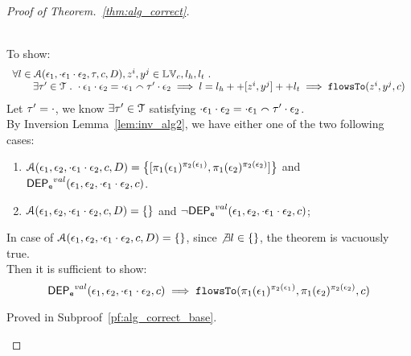 \begin{proof}[Proof of Theorem.~\ref{thm:alg_correct}]
\begin{case}
\\
To show:
\[
\begin{array}{l}
   \forall l \in \mathcal{A}(\mathtt{\epsilon}_1, \cdot  \mathtt{\epsilon}_1  {} \cdot {} \mathtt{\epsilon}_2, \mathtt{\tau}, c, D), z^i, y^j \in \mathbb{LV}_c, l_h, l_t ~.~ 
  \\ \qquad 
   \exists \mathtt{\tau}' \in \mathcal{T} ~.~ 
   \cdot \mathtt{\epsilon}_1  {} \cdot {} \mathtt{\epsilon}_2 = \cdot \mathtt{\epsilon}_1 \smallfrown \mathtt{\tau}' \cdot \mathtt{\epsilon}_2
   \implies 
   l = l_h ++ [z^i, y^j] ++ l_t 
   \implies \mathtt{flowsTo}(z^i, y^j, c)
\end{array}
\]
%
Let $\mathtt{\tau}' = \cdot$, we know $\exists \mathtt{\tau}' \in \mathcal{T}$ satisfying 
$\cdot {} \mathtt{\epsilon}_1  {} \cdot {} \mathtt{\epsilon}_2 = \cdot {} \mathtt{\epsilon}_1 \smallfrown \mathtt{\tau}' \cdot \mathtt{\epsilon}_2$.
\\
By Inversion Lemma~\ref{lem:inv_alg2}, we have either one of the two following cases:
\begin{enumerate}
  \item $\mathcal{A}(\event_1, \event_2, \cdot \event_1 \cdot \event_2, c, D) = 
  \left\{[\pi_1(\event_1)^{\pi_2(\event_1)}, \pi_1(\event_2)^{\pi_2(\event_2)}] \right \}$ 
  and $\mathsf{DEP_{\mathtt{e}}}^{val}(\mathtt{\epsilon}_1, \mathtt{\epsilon}_2, \cdot  \mathtt{\epsilon}_1 \cdot \mathtt{\epsilon}_2, c)$.
  \item  $\mathcal{A}(\mathtt{\epsilon}_1, \mathtt{\epsilon}_2, \cdot \mathtt{\epsilon}_1 \cdot \mathtt{\epsilon}_2, c, D) = \{\}$ 
  and $\neg \mathsf{DEP_{\mathtt{e}}}^{val}(\mathtt{\epsilon}_1, \mathtt{\epsilon}_2, \cdot  \mathtt{\epsilon}_1 \cdot \mathtt{\epsilon}_2, c)$;
\end{enumerate}
%
In case of $\mathcal{A}(\mathtt{\epsilon}_1, \mathtt{\epsilon}_2, \cdot \mathtt{\epsilon}_1 \cdot \mathtt{\epsilon}_2, c, D) = \{\}$,
since $\not\exists l \in \{\}$, the theorem is vacuously true.
%
\\
Then it is sufficient to show:
%
\[
  \mathsf{DEP_{\mathtt{e}}}^{val}(\mathtt{\epsilon}_1, \mathtt{\epsilon}_2, \cdot \mathtt{\epsilon}_1 \cdot \mathtt{\epsilon}_2, c) \implies \mathtt{flowsTo}(\pi_1(\mathtt{\epsilon}_1)^{\pi_2(\mathtt{\epsilon}_1)}, \pi_1(\mathtt{\epsilon}_2)^{\pi_2(\mathtt{\epsilon}_2)}, c)
\]
%

Proved in Subproof~\ref{pf:alg_correct_base}.


\end{case}
\end{proof}
